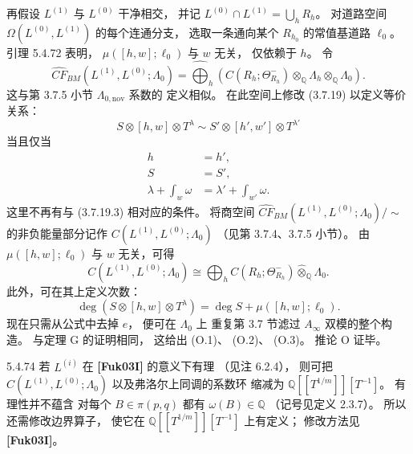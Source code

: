 再假设 $L^{(1)}$
与 $L^{(0)}$ 干净相交，
并记
$L^{(0)}\cap L^{(1)}
=\bigcup_hR_h$。
对道路空间
$\Omega(L^{(0)},L^{(1)})$
的每个连通分支，
选取一条通向某个
$R_{h_0}$ 的常值基道路 $\ell_0$。
引理 5.4.72 表明，
$\mu([h,w];\ell_0)$
与 $w$ 无关，
仅依赖于 $h$。
令
\[
\widehat{CF}_{BM}
(L^{(1)},L^{(0)};\Lambda_0)
=
\widehat{\bigoplus}_{h}
\left(
C(R_h;\Theta^-_{R_h})
\otimes_{\mathbb Q}\Lambda_h
\otimes_{\mathbb Q}\Lambda_0
\right).
\]
这与第 3.7.5 小节
$\Lambda_{0,\mathrm{nov}}$ 系数的
定义相似。
在此空间上修改 (3.7.19)
以定义等价关系：
\[
S\otimes[h,w]\otimes T^\lambda
\sim
S'\otimes[h',w']\otimes T^{\lambda'}
\]
当且仅当
\begin{align}
h&=h',
\tag{5.4.73.1}\label{eq:5-4-73-1}\\
S&=S',
\tag{5.4.73.2}\label{eq:5-4-73-2}\\
\lambda+\int_w\omega
&=\lambda'+\int_{w'}\omega.
\tag{5.4.73.3}\label{eq:5-4-73-3}
\end{align}
这里不再有与 (3.7.19.3)
相对应的条件。
将商空间
$\widehat{CF}_{BM}
(L^{(1)},L^{(0)};\Lambda_0)/{\sim}$
的非负能量部分记作
$C(L^{(1)},L^{(0)};\Lambda_0)$
（见第 3.7.4、3.7.5 小节）。
由 $\mu([h,w];\ell_0)$
与 $w$ 无关，可得
\[
C(L^{(1)},L^{(0)};\Lambda_0)
\cong
\bigoplus_h
C(R_h;\Theta^-_{R_h})
\widehat\otimes_{\mathbb Q}\Lambda_0.
\]
此外，可在其上定义次数：
\[
\deg(S\otimes[h,w]\otimes T^\lambda)
=\deg S+\mu([h,w];\ell_0).
\]
现在只需从公式中去掉 $e$，
便可在 $\Lambda_0$ 上
重复第 3.7 节滤过
$A_\infty$ 双模的整个构造。
与定理 G 的证明相同，
这给出 \textup{(O.1)}、
\textup{(O.2)}、
\textup{(O.3)}。
推论 O 证毕。

\begin{remark}{5.4.74}\label{rem:5-4-74}
若 $L^{(i)}$ 在
\textbf{[Fuk03I]} 的意义下有理
（见注 6.2.4），
则可把
$C(L^{(1)},L^{(0)};\Lambda_0)$
以及弗洛尔上同调的系数环
缩减为
$\mathbb Q[[T^{1/m}]][T^{-1}]$。
有理性并不蕴含
对每个 $B\in\pi(p,q)$
都有 $\omega(B)\in\mathbb Q$
（记号见定义 2.3.7）。
所以还需修改边界算子，
使它在
$\mathbb Q[[T^{1/m}]][T^{-1}]$
上有定义；
修改方法见 \textbf{[Fuk03I]}。
\end{remark}
